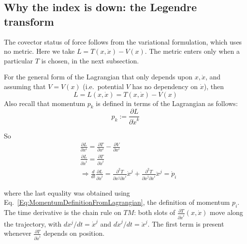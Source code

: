 \subsection{Why the index is down: the Legendre transform}
The covector status of force follows from the variational formulation,
which uses no metric. Here we take $L=T(x,\dot x)-V(x)$. The metric enters
only when a particular $T$ is chosen, in the next subsection.

For the general form of the Lagrangian that only depends upon $x,\dot{x}$,
and assuming that $V=V(x)$ (i.e.\ potential $V$ has no dependency on
$\dot{x}$), then
\[
L = L(x,\dot{x}) = T(x,\dot{x}) - V(x)
\]
Also recall that momentum $p_k$ is defined in terms of the Lagrangian as
follows:
\begin{equation}\label{Eq:MomentumDefinitionFromLagrangian}
p_k := \frac{\partial L}{ \partial \dot{x}^k}
\end{equation}

So
\begin{align}
& \frac{\partial L }{ \partial x^i}
  = \frac{\partial T}{ \partial x^i} - \frac{ \partial V}{\partial x^i}
  \label{Eq:LagrangianFormPart2} \\
& \frac{\partial L }{ \partial \dot{x}^i}
  = \frac{\partial T}{ \partial \dot{x}^i}
  \label{Eq:LagrangianFormPart0} \\
& \Longrightarrow \frac{d}{dt} \frac{\partial L }{ \partial \dot{x}^i}
  = \frac{ \partial^2 T}{ \partial x^j \partial \dot{x}^i } \dot{x}^j
  + \frac{ \partial^2 T}{ \partial \dot{x}^j \partial \dot{x}^i } \ddot{x}^j
  = \dot{p}_i \label{Eq:LagrangianFormPart1}
\end{align}

\noindent where the last equality was obtained using
Eq.~\ref{Eq:MomentumDefinitionFromLagrangian}, the definition of momentum
$p_i$. The time derivative is the chain rule on $TM$: both slots of
$\frac{\partial T}{\partial\dot x^i}(x,\dot x)$ move along the trajectory,
with $dx^j/dt=\dot x^j$ and $d\dot x^j/dt=\ddot x^j$. The first term is
present whenever $\frac{\partial T}{\partial\dot x^i}$ depends on position.

